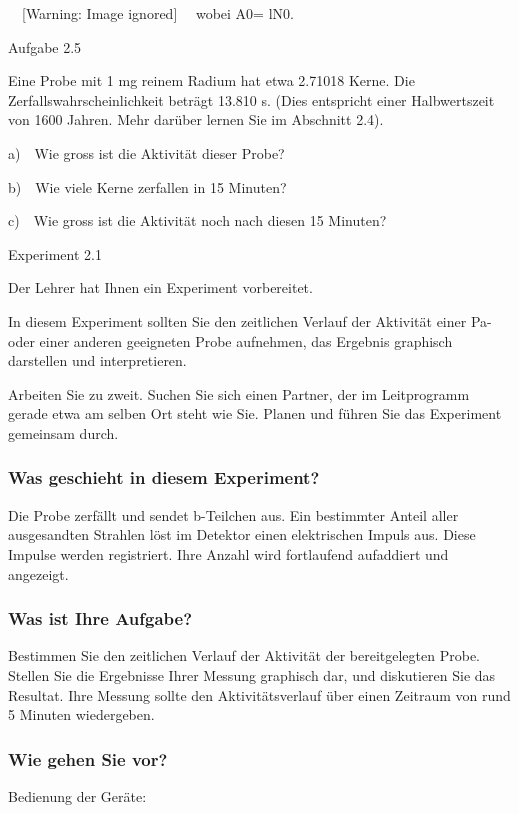 \documentclass[12pt,a4paper,twoside]{article}
\begin{document}
\ \   [Warning: Image ignored] %
 \ \ wobei A0= l{\textperiodcentered}N0.

Aufgabe 2.5

Eine Probe mit 1 mg reinem Radium hat etwa 2.7{\textperiodcentered}1018 Kerne. Die Zerfallswahrscheinlichkeit beträgt 13.8{\textperiodcentered}10 s. (Dies entspricht einer Halbwertszeit von 1600 Jahren. Mehr darüber lernen Sie im Abschnitt 2.4).

a)\ \ Wie gross ist die Aktivität dieser Probe?

b)\ \ Wie viele Kerne zerfallen in 15 Minuten?

c)\ \ Wie gross ist die Aktivität noch nach diesen 15 Minuten?


\bigskip

Experiment 2.1

Der Lehrer hat Ihnen ein Experiment vorbereitet. 

In diesem Experiment sollten Sie den zeitlichen Verlauf der Aktivität einer Pa\nobreakdash- oder einer anderen geeigneten Probe aufnehmen, das Ergebnis graphisch darstellen und interpretieren.

Arbeiten Sie zu zweit. Suchen Sie sich einen Partner, der im Leitprogramm gerade etwa am selben Ort steht wie Sie. Planen und führen Sie das Experiment gemeinsam durch.

\subsubsection*{Was geschieht in diesem Experiment?}
Die Probe zerfällt und sendet \textgreek{b}\nobreakdash-Teilchen aus. Ein bestimmter Anteil aller ausgesandten Strahlen löst im Detektor einen elektrischen Impuls aus. Diese Impulse werden registriert. Ihre Anzahl wird fortlaufend aufaddiert und angezeigt.

\subsubsection*{Was ist Ihre Aufgabe?}
Bestimmen Sie den zeitlichen Verlauf der Aktivität der bereitgelegten Probe. Stellen Sie die Ergebnisse Ihrer Messung graphisch dar, und diskutieren Sie das Resultat. Ihre Messung sollte den Aktivitätsverlauf über einen Zeitraum von rund 5 Minuten wiedergeben.

\subsubsection*{Wie gehen Sie vor?}
Bedienung der Geräte:
\end{document}
